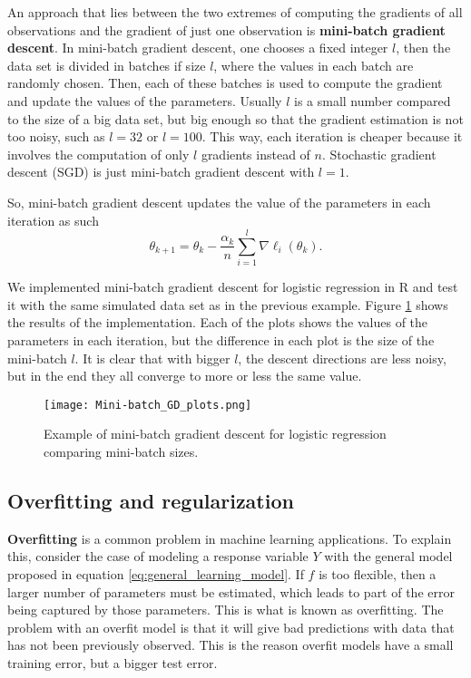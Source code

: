 An approach that lies between the two extremes of computing the gradients of all observations and the gradient of just one observation is \textbf{mini-batch gradient descent}. In mini-batch gradient descent, one chooses a fixed integer $l$, then the data set is divided in batches if size $l$, where the values in each batch are randomly chosen. Then, each of these batches is used to compute the gradient and update the values of the parameters. Usually $l$ is a small number compared to the size of a big data set, but big enough so that the gradient estimation is not too noisy, such as $l = 32$ or $l = 100$. This way, each iteration is cheaper because it involves the computation of only $l$ gradients instead of $n$. Stochastic gradient descent (SGD) is just mini-batch gradient descent with $l = 1$.

So, mini-batch gradient descent updates the value of the parameters in each iteration as such
\begin{equation}
  \theta_{k+1} = \theta_k - \frac{\alpha_k}{n} \sum_{i = 1}^l \nabla \ell_i(\theta_k).
\end{equation}

We implemented mini-batch gradient descent for logistic regression in R and test it with the same simulated data set as in the previous example. Figure \ref{fig:Mini-batch_GD_plots} shows the results of the implementation. Each of the plots shows the values of the parameters in each iteration, but the difference in each plot is the size of the mini-batch $l$. It is clear that with bigger $l$, the descent directions are less noisy, but in the end they all converge to more or less the same value.

\begin{figure}[H]
    \centering
    \texttt{[image: Mini-batch\_GD\_plots.png]}
    \caption{Example of mini-batch gradient descent for logistic regression comparing mini-batch sizes.}
    \label{fig:Mini-batch_GD_plots}
\end{figure}


\subsection{Overfitting and regularization}

\textbf{Overfitting} is a common problem in machine learning applications. To explain this, consider the case of modeling a response variable $Y$ with the general model proposed in equation \eqref{eq:general_learning_model}. If $f$ is too flexible, then a larger number of parameters must be estimated, which leads to part of the error being captured by those parameters. This is what is known as overfitting. The problem with an overfit model is that it will give bad predictions with data that has not been previously observed. This is the reason overfit models have a small training error, but a bigger test error.

